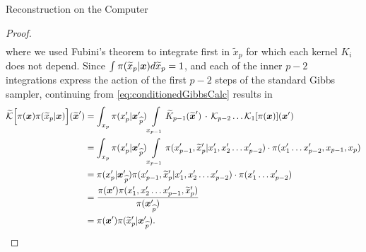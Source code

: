 \begin{chapter}{Reconstruction on the Computer}
\begin{proof}
\begin{align}
  \end{align}
  where we used Fubini's theorem to integrate first in $\tilde x_p$ for which each kernel $K_i$ does not depend. 
  Since  $\int\pi(\widetilde x_p|\mbox{\boldmath$x$})d\widetilde x_p = 1$, and each of the inner $p-2$ integrations express the action of the first $p-2$ steps of the standard Gibbs sampler, continuing from \eqref{eq:conditionedGibbsCalc} results in 
  \begin{align}
    \widetilde{\mathcal K}\Big[ \pi(\mbox{\boldmath$x$})\pi(\widetilde x_p|\mbox{\boldmath$x$})\Big](\widetilde{\mbox{\boldmath$x$}}')
      &= \int_{x_p}\pi(x_p'|\mbox{\boldmath$x$}_{\,\widehat{p}}') \int\limits_{x_{p-1}}\widetilde K_{p-1}(\widetilde{\mbox{\boldmath$x$}}')\,\cdot\,\mathcal K_{p-2}\dots \mathcal K_{1}[\pi(\mbox{\boldmath$x$})](\mbox{\boldmath$x$}')\nonumber \\ 
      &= \int_{x_p}\pi(x_p'|\mbox{\boldmath$x$}_{\,\widehat{p}}') \int\limits_{x_{p-1}}\pi(x_{p-1}',\widetilde x_p'|x_1',x_2'\dots x_{p-2}')\cdot\pi(x_1'\dots x_{p-2}', x_{p-1},x_p)\nonumber \\ 
      &= \pi(x_p'|\mbox{\boldmath$x$}_{\,\widehat{p}}') \pi(x_{p-1}',\widetilde x_p'|x_1',x_2'\dots x_{p-2}')\cdot\pi(x_1'\dots x_{p-2}')\nonumber \\ 
      &= \frac{\pi(\mbox{\boldmath$x$}')\pi(x_1',x_2'\dots x_{p-1}', \widetilde x_p')}{\pi(\mbox{\boldmath$x$}_{\,\widehat{p}}')}\nonumber \\ 
      &= \pi(\mbox{\boldmath$x$}')\pi(\widetilde x_p'|\mbox{\boldmath$x$}_{\,\widehat{p}}').
  \end{align}

\end{proof}
\end{chapter}
